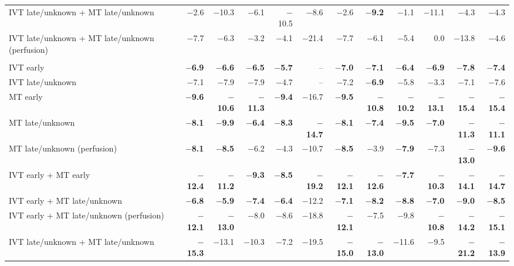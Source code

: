\begin{landscape}
{\begin{longtable}{p{4.9cm}rrrrrrrrrrr}
IVT late/unknown + MT late/unknown & $-$2.6 & $-$10.3 & $-$6.1 & $-$10.5 & $-$8.6 & $-$2.6 & \textbf{$-$9.2} & $-$1.1 & $-$11.1 & $-$4.3 & $-$4.3 \\
IVT late/unknown + MT late/unknown (perfusion) & $-$7.7 & $-$6.3 & $-$3.2 & $-$4.1 & $-$21.4 & $-$7.7 & $-$6.1 & $-$5.4 & 0.0 & $-$13.8 & $-$4.6 \\
\addlinespace
\multicolumn{12}{l}{\textbf{NIHSS 16--20}}\\
IVT early & \textbf{$-$6.9} & \textbf{$-$6.6} & \textbf{$-$6.5} & \textbf{$-$5.7} & -- & \textbf{$-$7.0} & \textbf{$-$7.1} & \textbf{$-$6.4} & \textbf{$-$6.9} & \textbf{$-$7.8} & \textbf{$-$7.4} \\
IVT late/unknown & $-$7.1 & $-$7.9 & $-$7.9 & $-$4.7 & -- & $-$7.2 & \textbf{$-$6.9} & $-$5.8 & $-$3.3 & $-$7.1 & $-$7.6 \\
MT early & \textbf{$-$9.6} & \textbf{$-$10.6} & \textbf{$-$11.3} & \textbf{$-$9.4} & $-$16.7 & \textbf{$-$9.5} & \textbf{$-$10.8} & \textbf{$-$10.2} & \textbf{$-$13.1} & \textbf{$-$15.4} & \textbf{$-$15.4} \\
MT late/unknown & \textbf{$-$8.1} & \textbf{$-$9.9} & \textbf{$-$6.4} & \textbf{$-$8.3} & \textbf{$-$14.7} & \textbf{$-$8.1} & \textbf{$-$7.4} & \textbf{$-$9.5} & \textbf{$-$7.0} & \textbf{$-$11.3} & \textbf{$-$11.1} \\
MT late/unknown (perfusion) & \textbf{$-$8.1} & \textbf{$-$8.5} & $-$6.2 & $-$4.3 & $-$10.7 & \textbf{$-$8.5} & $-$3.9 & \textbf{$-$7.9} & $-$7.3 & \textbf{$-$13.0} & \textbf{$-$9.6} \\
IVT early + MT early & \textbf{$-$12.4} & \textbf{$-$11.2} & \textbf{$-$9.3} & \textbf{$-$8.5} & \textbf{$-$19.2} & \textbf{$-$12.1} & \textbf{$-$12.6} & \textbf{$-$7.7} & \textbf{$-$10.3} & \textbf{$-$14.1} & \textbf{$-$14.7} \\
IVT early + MT late/unknown & \textbf{$-$6.8} & \textbf{$-$5.9} & \textbf{$-$7.4} & \textbf{$-$6.4} & $-$12.2 & \textbf{$-$7.1} & \textbf{$-$8.2} & \textbf{$-$8.8} & \textbf{$-$7.0} & \textbf{$-$9.0} & \textbf{$-$8.5} \\
IVT early + MT late/unknown (perfusion) & \textbf{$-$12.1} & \textbf{$-$13.0} & $-$8.0 & $-$8.6 & $-$18.8 & \textbf{$-$12.1} & $-$7.5 & $-$9.8 & \textbf{$-$10.8} & \textbf{$-$14.2} & \textbf{$-$15.1} \\
IVT late/unknown + MT late/unknown & \textbf{$-$15.3} & $-$13.1 & $-$10.3 & $-$7.2 & $-$19.5 & \textbf{$-$15.0} & \textbf{$-$13.0} & $-$11.6 & $-$9.5 & \textbf{$-$21.2} & \textbf{$-$13.9} \\

\end{longtable}}
\end{landscape}
